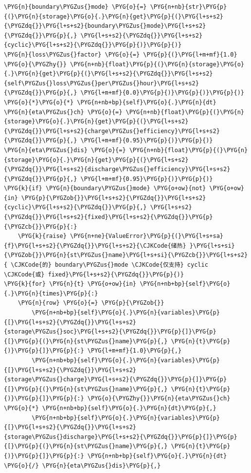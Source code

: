 \begin{Verbatim}
\PYG{n}{boundary\PYGZus{}mode} \PYG{o}{=} \PYG{n+nb}{str}\PYG{p}{(}\PYG{n}{storage}\PYG{o}{.}\PYG{n}{get}\PYG{p}{(}\PYG{l+s+s2}{\PYGZdq{}}\PYG{l+s+s2}{boundary\PYGZus{}mode}\PYG{l+s+s2}{\PYGZdq{}}\PYG{p}{,} \PYG{l+s+s2}{\PYGZdq{}}\PYG{l+s+s2}{cyclic}\PYG{l+s+s2}{\PYGZdq{}}\PYG{p}{)}\PYG{p}{)}
\PYG{n}{loss\PYGZus{}factor} \PYG{o}{=} \PYG{p}{(}\PYG{l+m+mf}{1.0} \PYG{o}{\PYGZhy{}} \PYG{n+nb}{float}\PYG{p}{(}\PYG{n}{storage}\PYG{o}{.}\PYG{n}{get}\PYG{p}{(}\PYG{l+s+s2}{\PYGZdq{}}\PYG{l+s+s2}{self\PYGZus{}loss\PYGZus{}per\PYGZus{}hour}\PYG{l+s+s2}{\PYGZdq{}}\PYG{p}{,} \PYG{l+m+mf}{0.0}\PYG{p}{)}\PYG{p}{)}\PYG{p}{)} \PYG{o}{*}\PYG{o}{*} \PYG{n+nb+bp}{self}\PYG{o}{.}\PYG{n}{dt}
\PYG{n}{eta\PYGZus{}ch} \PYG{o}{=} \PYG{n+nb}{float}\PYG{p}{(}\PYG{n}{storage}\PYG{o}{.}\PYG{n}{get}\PYG{p}{(}\PYG{l+s+s2}{\PYGZdq{}}\PYG{l+s+s2}{charge\PYGZus{}efficiency}\PYG{l+s+s2}{\PYGZdq{}}\PYG{p}{,} \PYG{l+m+mf}{0.95}\PYG{p}{)}\PYG{p}{)}
\PYG{n}{eta\PYGZus{}dis} \PYG{o}{=} \PYG{n+nb}{float}\PYG{p}{(}\PYG{n}{storage}\PYG{o}{.}\PYG{n}{get}\PYG{p}{(}\PYG{l+s+s2}{\PYGZdq{}}\PYG{l+s+s2}{discharge\PYGZus{}efficiency}\PYG{l+s+s2}{\PYGZdq{}}\PYG{p}{,} \PYG{l+m+mf}{0.95}\PYG{p}{)}\PYG{p}{)}
\PYG{k}{if} \PYG{n}{boundary\PYGZus{}mode} \PYG{o+ow}{not} \PYG{o+ow}{in} \PYG{p}{\PYGZob{}}\PYG{l+s+s2}{\PYGZdq{}}\PYG{l+s+s2}{cyclic}\PYG{l+s+s2}{\PYGZdq{}}\PYG{p}{,} \PYG{l+s+s2}{\PYGZdq{}}\PYG{l+s+s2}{fixed}\PYG{l+s+s2}{\PYGZdq{}}\PYG{p}{\PYGZcb{}}\PYG{p}{:}
    \PYG{k}{raise} \PYG{n+ne}{ValueError}\PYG{p}{(}\PYG{l+s+sa}{f}\PYG{l+s+s2}{\PYGZdq{}}\PYG{l+s+s2}{\CJKCode{储热} }\PYG{l+s+si}{\PYGZob{}}\PYG{n}{st\PYGZus{}name}\PYG{l+s+si}{\PYGZcb{}}\PYG{l+s+s2}{ \CJKCode{的} boundary\PYGZus{}mode \CJKCode{仅支持} cyclic \CJKCode{或} fixed}\PYG{l+s+s2}{\PYGZdq{}}\PYG{p}{)}
\PYG{k}{for} \PYG{n}{t} \PYG{o+ow}{in} \PYG{n+nb+bp}{self}\PYG{o}{.}\PYG{n}{times}\PYG{p}{:}
    \PYG{n}{row} \PYG{o}{=} \PYG{p}{\PYGZob{}}
        \PYG{n+nb+bp}{self}\PYG{o}{.}\PYG{n}{variables}\PYG{p}{[}\PYG{l+s+s2}{\PYGZdq{}}\PYG{l+s+s2}{storage\PYGZus{}soc}\PYG{l+s+s2}{\PYGZdq{}}\PYG{p}{]}\PYG{p}{[}\PYG{p}{(}\PYG{n}{st\PYGZus{}name}\PYG{p}{,} \PYG{n}{t}\PYG{p}{)}\PYG{p}{]}\PYG{p}{:} \PYG{l+m+mf}{1.0}\PYG{p}{,}
        \PYG{n+nb+bp}{self}\PYG{o}{.}\PYG{n}{variables}\PYG{p}{[}\PYG{l+s+s2}{\PYGZdq{}}\PYG{l+s+s2}{storage\PYGZus{}charge}\PYG{l+s+s2}{\PYGZdq{}}\PYG{p}{]}\PYG{p}{[}\PYG{p}{(}\PYG{n}{st\PYGZus{}name}\PYG{p}{,} \PYG{n}{t}\PYG{p}{)}\PYG{p}{]}\PYG{p}{:} \PYG{o}{\PYGZhy{}}\PYG{n}{eta\PYGZus{}ch} \PYG{o}{*} \PYG{n+nb+bp}{self}\PYG{o}{.}\PYG{n}{dt}\PYG{p}{,}
        \PYG{n+nb+bp}{self}\PYG{o}{.}\PYG{n}{variables}\PYG{p}{[}\PYG{l+s+s2}{\PYGZdq{}}\PYG{l+s+s2}{storage\PYGZus{}discharge}\PYG{l+s+s2}{\PYGZdq{}}\PYG{p}{]}\PYG{p}{[}\PYG{p}{(}\PYG{n}{st\PYGZus{}name}\PYG{p}{,} \PYG{n}{t}\PYG{p}{)}\PYG{p}{]}\PYG{p}{:} \PYG{n+nb+bp}{self}\PYG{o}{.}\PYG{n}{dt} \PYG{o}{/} \PYG{n}{eta\PYGZus{}dis}\PYG{p}{,}

\end{Verbatim}
